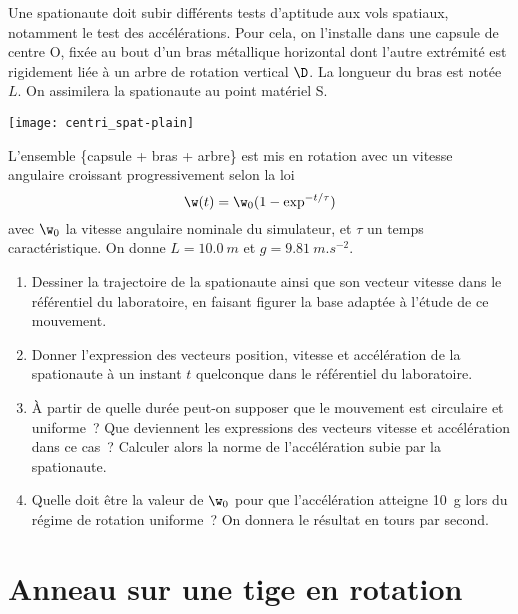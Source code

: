 \documentclass[a4paper, 12pt, final, garamond]{book}
\begin{document}
\hspace*{-0.75cm}
\begin{minipage}{0.70\linewidth}
    Une spationaute doit subir différents tests d'aptitude aux vols spatiaux,
    notamment le test des accélérations. Pour cela, on l'installe dans une
    capsule de centre O, fixée au bout d'un bras métallique horizontal dont
    l'autre extrémité est rigidement liée à un arbre de rotation vertical $\D$.
    La longueur du bras est notée $L$. On assimilera la spationaute au point
    matériel S. \bigbreak
\end{minipage}
\hfill
\begin{minipage}{0.25\linewidth}
    \begin{center}
        \texttt{[image: centri\_spat-plain]}
    \end{center}
\end{minipage}

L'ensemble \{capsule + bras + arbre\} est mis en rotation avec un vitesse
angulaire croissant progressivement selon la loi
\[\w(t) = \w_0(1-\exp^{-t/\tau})\]
avec $\w_0$ la vitesse angulaire nominale du simulateur, et $\tau$ un temps
caractéristique. On donne $L = \SI{10.0}{m}$ et $g = \SI{9.81}{m.s^{-2}}$.
\bigbreak
\begin{enumerate}
    \item Dessiner la trajectoire de la spationaute ainsi que son vecteur
        vitesse dans le référentiel du laboratoire, en faisant figurer la base
        adaptée à l'étude de ce mouvement.
    \item Donner l'expression des vecteurs position, vitesse et accélération de
        la spationaute à un instant $t$ quelconque dans le référentiel du
        laboratoire.
    \item À partir de quelle durée peut-on supposer que le mouvement est
        circulaire et uniforme~? Que deviennent les expressions des vecteurs
        vitesse et accélération dans ce cas~? Calculer alors la norme de
        l'accélération subie par la spationaute.
    \item Quelle doit être la valeur de $\w_0$ pour que l'accélération atteigne
        \SI{10}{g} lors du régime de rotation uniforme~? On donnera le résultat
        en tours par second.
\end{enumerate}

\section{Anneau sur une tige en rotation}
\end{document}

